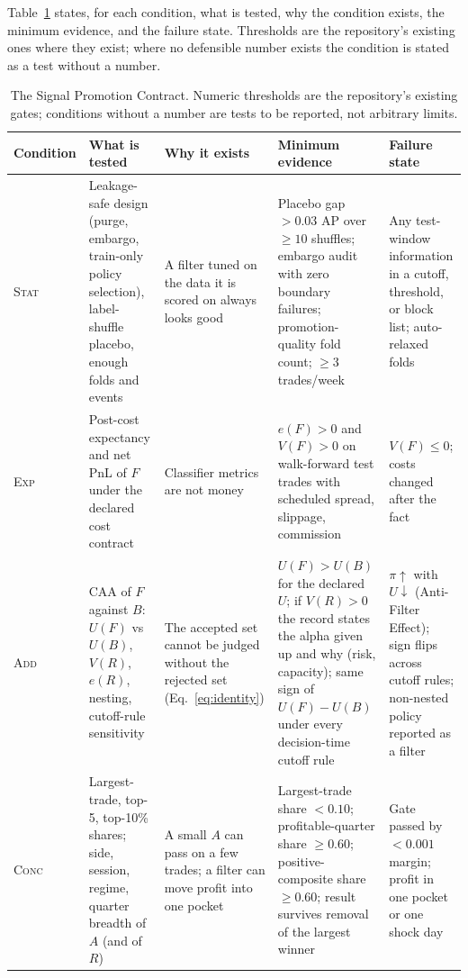 \documentclass[10pt]{article}
\newcommand{\AF}{Anti-Filter Effect}
\newcommand{\SPC}{Signal Promotion Contract}
\begin{document}
Table~\ref{tab:spc} states, for each condition, what is tested, why the condition exists, the minimum evidence, and the failure state. Thresholds are the repository's existing ones where they exist; where no defensible number exists the condition is stated as a test without a number.

\begin{table}[t]
\centering\scriptsize
\caption{The \SPC. Numeric thresholds are the repository's existing gates; conditions without a number are tests to be reported, not arbitrary limits.}
\label{tab:spc}
\begin{tabular}{@{}p{1.7cm}p{3.3cm}p{3.0cm}p{3.5cm}p{2.9cm}@{}}
\toprule
Condition & What is tested & Why it exists & Minimum evidence & Failure state \\
\midrule
\textsc{Stat} & Leakage-safe design (purge, embargo, train-only policy selection), label-shuffle placebo, enough folds and events & A filter tuned on the data it is scored on always looks good & Placebo gap $>0.03$ AP over $\ge 10$ shuffles; embargo audit with zero boundary failures; promotion-quality fold count; $\ge 3$ trades/week & Any test-window information in a cutoff, threshold, or block list; auto-relaxed folds \\
\addlinespace
\textsc{Exp} & Post-cost expectancy and net PnL of $F$ under the declared cost contract & Classifier metrics are not money & $e(F)>0$ and $V(F)>0$ on walk-forward test trades with scheduled spread, slippage, commission & $V(F)\le 0$; costs changed after the fact \\
\addlinespace
\textsc{Add} & CAA of $F$ against $B$: $U(F)$ vs $U(B)$, $V(R)$, $e(R)$, nesting, cutoff-rule sensitivity & The accepted set cannot be judged without the rejected set (Eq.~\ref{eq:identity}) & $U(F)>U(B)$ for the declared $U$; if $V(R)>0$ the record states the alpha given up and why (risk, capacity); same sign of $U(F)-U(B)$ under every decision-time cutoff rule & $\pi\uparrow$ with $U\downarrow$ (\AF); sign flips across cutoff rules; non-nested policy reported as a filter \\
\addlinespace
\textsc{Conc} & Largest-trade, top-5, top-10\% shares; side, session, regime, quarter breadth of $A$ (and of $R$) & A small $A$ can pass on a few trades; a filter can move profit into one pocket & Largest-trade share $<0.10$; profitable-quarter share $\ge 0.60$; positive-composite share $\ge 0.60$; result survives removal of the largest winner & Gate passed by $<0.001$ margin; profit in one pocket or one shock day \\

\end{tabular}
\end{table}
\end{document}

